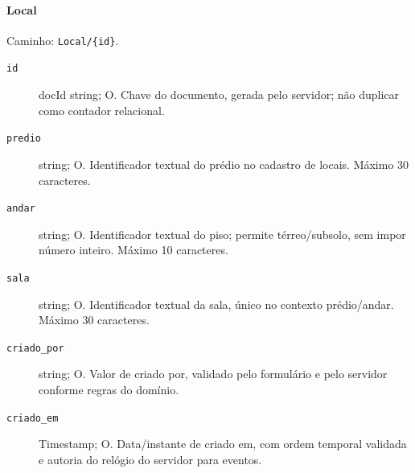 \paragraph{Local}\mbox{}\par
Caminho: \texttt{Local/\{id\}}.
\begin{description}
\item[\texttt{id}] docId string; O. Chave do documento, gerada pelo servidor; não duplicar como contador relacional.
\item[\texttt{predio}] string; O. Identificador textual do prédio no cadastro de locais. Máximo 30 caracteres.
\item[\texttt{andar}] string; O. Identificador textual do piso; permite térreo/subsolo, sem impor número inteiro. Máximo 10 caracteres.
\item[\texttt{sala}] string; O. Identificador textual da sala, único no contexto prédio/andar. Máximo 30 caracteres.
\item[\texttt{criado\_por}] string; O. Valor de criado por, validado pelo formulário e pelo servidor conforme regras do domínio.
\item[\texttt{criado\_em}] Timestamp; O. Data/instante de criado em, com ordem temporal validada e autoria do relógio do servidor para eventos.
\end{description}

